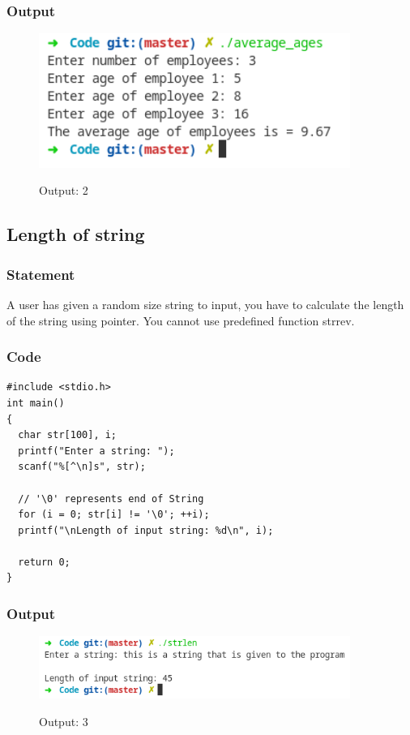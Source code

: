 \pagebreak
\subsubsection{Output}
\begin{figure}[!htb]
  \centering
  \includegraphics[width=4in]{Images/average.png}
  \label{output:2}
  \caption{Output: 2}
\end{figure}


\pagebreak
\subsection{Length of string}

\subsubsection{Statement}
A user has given a random size string to input, you have to calculate the length of the
string using pointer. You cannot use predefined function strrev.

\subsubsection{Code}
\begin{verbatim} 
#include <stdio.h>
int main()
{
  char str[100], i;
  printf("Enter a string: ");
  scanf("%[^\n]s", str);

  // '\0' represents end of String
  for (i = 0; str[i] != '\0'; ++i);
  printf("\nLength of input string: %d\n", i);

  return 0;
}
\end{verbatim}
\subsubsection{Output}
\begin{figure}[!htb]
  \centering
  \includegraphics[width=4in]{Images/strlen.png}
  \label{output:3}
  \caption{Output: 3}
\end{figure}


